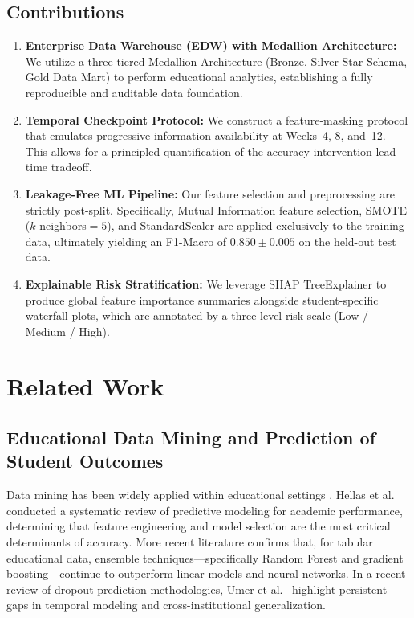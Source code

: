 \documentclass[conference,a4paper]{IEEEtran}
\begin{document}
\subsection{Contributions}
\begin{enumerate}[leftmargin=*, label=\textbf{C\arabic*.}]
\item \textbf{Enterprise Data Warehouse (EDW) with Medallion Architecture:} We utilize a three-tiered Medallion Architecture (Bronze, Silver Star-Schema, Gold Data Mart) to perform educational analytics, establishing a fully reproducible and auditable data foundation.
\item \textbf{Temporal Checkpoint Protocol:} We construct a feature-masking protocol that emulates progressive information availability at Weeks~4, 8, and~12. This allows for a principled quantification of the accuracy-intervention lead time tradeoff.
\item \textbf{Leakage-Free ML Pipeline:} Our feature selection and preprocessing are strictly post-split. Specifically, Mutual Information feature selection, SMOTE ($k$-neighbors${=}5$), and StandardScaler are applied exclusively to the training data, ultimately yielding an F1-Macro of $0.850 \pm 0.005$ on the held-out test data.
\item \textbf{Explainable Risk Stratification:} We leverage SHAP TreeExplainer to produce global feature importance summaries alongside student-specific waterfall plots, which are annotated by a three-level risk scale (Low / Medium / High).
\end{enumerate}

\section{Related Work}\label{sec:related}

\subsection{Educational Data Mining and Prediction of Student Outcomes}
Data mining has been widely applied within educational settings \cite{romero2020, baker2014edm}. Hellas et al.\ \cite{hellas2018} conducted a systematic review of predictive modeling for academic performance, determining that feature engineering and model selection are the most critical determinants of accuracy. More recent literature \cite{namoun2021, albreiki2021} confirms that, for tabular educational data, ensemble techniques---specifically Random Forest and gradient boosting---continue to outperform linear models and neural networks. In a recent review of dropout prediction methodologies, Umer et al.\ \cite{umer2024dropout} highlight persistent gaps in temporal modeling and cross-institutional generalization.
\end{document}
